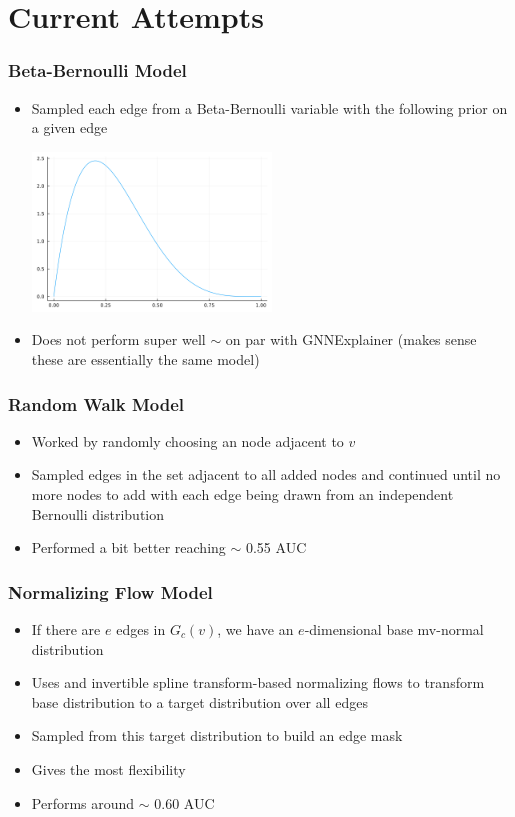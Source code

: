 \documentclass[11pt]{beamer}
\begin{document}
\section{Current Attempts}
\begin{frame}
    \frametitle{Beta-Bernoulli Model}
    \begin{itemize}
        \item Sampled each edge from a Beta-Bernoulli variable with the following prior on a given edge \\
        \begin{center}
            \includegraphics[width = 0.5\textwidth]{beta_bernoulli.png}
        \end{center}
        \item Does not perform super well $\sim$ on par with GNNExplainer (makes sense these are essentially the same model)
    \end{itemize}
\end{frame}

\begin{frame}
    \frametitle{Random Walk Model}

    \begin{itemize}
        \item Worked by randomly choosing an node adjacent to $v$
        \item Sampled edges in the set adjacent to all added nodes and continued until no more nodes to add with each edge being drawn from an independent Bernoulli distribution
        \item Performed a bit better reaching $\sim$ 0.55 AUC
    \end{itemize}
\end{frame}

\begin{frame}
    \frametitle{Normalizing Flow Model}

    \begin{itemize}
        \item If there are $e$ edges in $G_c(v)$, we have an $e$-dimensional base mv-normal distribution
        \item Uses and invertible spline transform-based normalizing flows to transform base distribution to a target distribution over all edges
        \item Sampled from this target distribution to build an edge mask
        \item Gives the most flexibility
        \item Performs around $\sim$ 0.60 AUC
    \end{itemize}
\end{frame}
\end{document}
